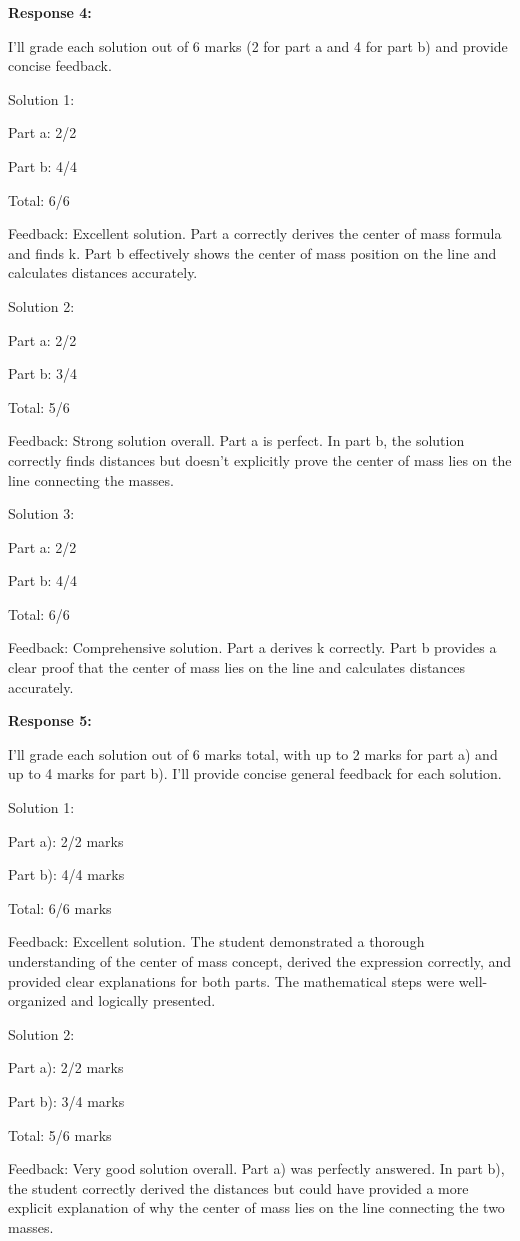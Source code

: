 \documentclass[a4paper,11pt]{article}
\begin{document}
\bigskip
\textbf{Response 4:}

I'll grade each solution out of 6 marks (2 for part a and 4 for part b) and provide concise feedback.

Solution 1:

Part a: 2/2

Part b: 4/4

Total: 6/6

Feedback: Excellent solution. Part a correctly derives the center of mass formula and finds k. Part b effectively shows the center of mass position on the line and calculates distances accurately.

Solution 2:

Part a: 2/2

Part b: 3/4

Total: 5/6

Feedback: Strong solution overall. Part a is perfect. In part b, the solution correctly finds distances but doesn't explicitly prove the center of mass lies on the line connecting the masses.

Solution 3:

Part a: 2/2

Part b: 4/4

Total: 6/6

Feedback: Comprehensive solution. Part a derives k correctly. Part b provides a clear proof that the center of mass lies on the line and calculates distances accurately.

\bigskip
\textbf{Response 5:}

I'll grade each solution out of 6 marks total, with up to 2 marks for part a) and up to 4 marks for part b). I'll provide concise general feedback for each solution.

Solution 1:

Part a): 2/2 marks

Part b): 4/4 marks

Total: 6/6 marks

Feedback: Excellent solution. The student demonstrated a thorough understanding of the center of mass concept, derived the expression correctly, and provided clear explanations for both parts. The mathematical steps were well-organized and logically presented.

Solution 2:

Part a): 2/2 marks

Part b): 3/4 marks

Total: 5/6 marks

Feedback: Very good solution overall. Part a) was perfectly answered. In part b), the student correctly derived the distances but could have provided a more explicit explanation of why the center of mass lies on the line connecting the two masses.
\end{document}
